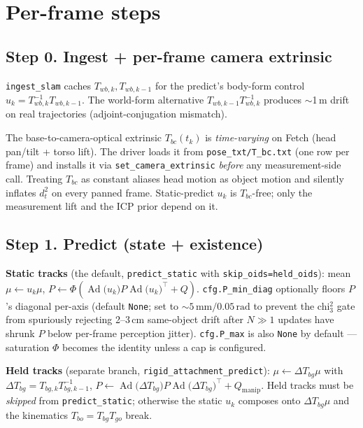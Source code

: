 \documentclass[11pt]{article}
\newcommand{\Ad}[1]{\operatorname{Ad}\!\bigl(#1\bigr)}
\newcommand{\code}[1]{\texttt{\small #1}}
\begin{document}
\section{Per-frame steps}

\subsection{Step 0. Ingest + per-frame camera extrinsic}\label{sec:Tbc}

\code{ingest\_slam} caches $T_{wb,k},T_{wb,k-1}$ for the predict's body-form
control $u_k=T_{wb,k}^{-1}T_{wb,k-1}$. The world-form alternative
$T_{wb,k-1}T_{wb,k}^{-1}$ produces $\sim$1\,m drift on real trajectories
(adjoint-conjugation mismatch).

The base-to-camera-optical extrinsic $T_{bc}(t_k)$ is \emph{time-varying}
on Fetch (head pan/tilt + torso lift). The driver loads it from
\code{pose\_txt/T\_bc.txt} (one row per frame) and installs it via
\code{set\_camera\_extrinsic} \emph{before} any measurement-side call.
Treating $T_{bc}$ as constant aliases head motion as object motion and
silently inflates $d^2_t$ on every panned frame. Static-predict $u_k$
is $T_{bc}$-free; only the measurement lift and the ICP prior depend
on it.

\subsection{Step 1. Predict (state + existence)}\label{sec:predict}

\textbf{Static tracks} (the default, \code{predict\_static} with
\code{skip\_oids=held\_oids}): mean $\mu\!\leftarrow\!u_k\mu$,
$P\!\leftarrow\!\Phi(\Ad{u_k}P\Ad{u_k}^{\!\top}+Q)$. \code{cfg.P\_min\_diag}
optionally floors $P$'s diagonal per-axis (default \code{None}; set to
$\sim 5\,\text{mm}/0.05\,\text{rad}$ to prevent the chi$^2_3$ gate from
spuriously rejecting 2--3\,cm same-object drift after $N\!\gg\!1$
updates have shrunk $P$ below per-frame perception jitter).
\code{cfg.P\_max} is also \code{None} by default — saturation $\Phi$
becomes the identity unless a cap is configured.

\textbf{Held tracks} (separate branch, \code{rigid\_attachment\_predict}):
$\mu\!\leftarrow\!\Delta T_{bg}\mu$ with $\Delta T_{bg}=T_{bg,k}T_{bg,k-1}^{-1}$,
$P\!\leftarrow\!\Ad{\Delta T_{bg}}P\Ad{\Delta T_{bg}}^{\!\top}+Q_{\text{manip}}$.
Held tracks must be \emph{skipped} from \code{predict\_static}; otherwise
the static $u_k$ composes onto $\Delta T_{bg}\mu$ and the kinematics
$T_{bo}=T_{bg}T_{go}$ break.
\end{document}
